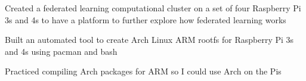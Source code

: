 \documentclass[letterpaper]{resume}
\begin{document}
\begin{compactitem}
\item Created a federated learning computational cluster on a set of four Raspberry Pi 3s and 4s to have a platform to further explore how federated learning works
\item Built an automated tool to create Arch Linux ARM rootfs for Raspberry Pi 3s and 4s using pacman and bash
\item Practiced compiling Arch packages for ARM so I could use Arch on the Pis
\end{compactitem}
 

\end{document}
